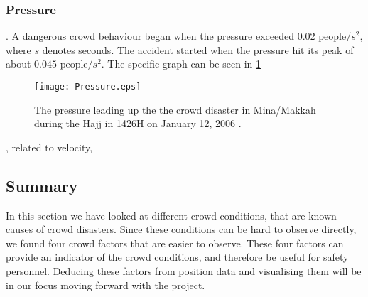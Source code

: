 
\subsubsection{Pressure}
. A dangerous crowd behaviour began when the pressure exceeded $0.02 \text{ people} / s^2$, where $s$ denotes seconds. The accident started when the pressure hit its peak of about $0.045 \text{ people} / s^2$. The specific graph can be seen in \cref{mekkahCrowdDistaster206}

\begin{figure}
    \centering
    \texttt{[image: Pressure.eps]}
    \caption{The pressure leading up the the crowd disaster in Mina/Makkah during the Hajj in 1426H on January 12, 2006 \cite{empircalstudy}.}
    \label{mekkahCrowdDistaster206}
\end{figure}


, related to velocity,



\subsection{Summary}\label{sec:crowd_conditions_summary}

In this section we have looked at different crowd conditions, that are known causes of crowd disasters. Since these conditions can be hard to observe directly, we found four crowd factors that are easier to observe. These four factors can provide an indicator of the crowd conditions, and therefore be useful for safety personnel. Deducing these factors from position data and visualising them will be in our focus moving forward with the project.
